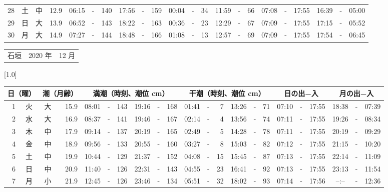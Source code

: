 \documentclass[12pt,a4j]{jsarticle}
\begin{document}
\begin{table}[htbp]
\begin{center}
{\begin{tabular}{|rc|cr|ccrccr|ccrccr|ccc|ccc|}
28 & 土 & 中 & 12.9 &  06:15 &-& 140 &  17:56 &-& 159 &  00:04 &-&  34 &  11:59 &-&  66 & 07:08 & -& 17:55 & 16:39 & -& 05:00 \\
29 & 日 & 大 & 13.9 &  06:52 &-& 143 &  18:22 &-& 163 &  00:36 &-&  23 &  12:29 &-&  67 & 07:09 & -& 17:55 & 17:15 & -& 05:52 \\
30 & 月 & 大 & 14.9 &  07:27 &-& 144 &  18:48 &-& 166 &  01:08 &-&  13 &  12:57 &-&  69 & 07:09 & -& 17:55 & 17:54 & -& 06:45 \\
   \hline
   \end{tabular}}
   \end{center}
\end{table}
\newpage
 \begin{table}[htbp]
 \begin{center}
 \begin{tabular}{lcc}
 \LARGE{石垣}  & \large{2020 年} & \large{12 月} \\
 \end{tabular}
 \end{center}
 \begin{center}
    \scalebox{0.7}[1.0]{
    \begin{tabular}{|rc|cr|ccrccr|ccrccr|ccc|ccc|}
    \hline
    \multicolumn{2}{|c|}{日（曜）} & \multicolumn{2}{c|}{潮（月齢）} & \multicolumn{6}{c|}{満潮（時刻、潮位 cm）} & \multicolumn{6}{c|}{干潮（時刻、潮位 cm）} & \multicolumn{3}{c|}{日の出−入} &  \multicolumn{3}{c|}{月の出−入}\\
 \hline
 1 & 火 & 大 & 15.9 &  08:01 &-& 143 &  19:16 &-& 168 &  01:41 &-&   7 &  13:26 &-&  71 & 07:10 & -& 17:55 & 18:38 & -& 07:39 \\
 2 & 水 & 大 & 16.9 &  08:37 &-& 141 &  19:46 &-& 167 &  02:14 &-&   4 &  13:56 &-&  74 & 07:11 & -& 17:55 & 19:26 & -& 08:34 \\
 3 & 木 & 中 & 17.9 &  09:14 &-& 137 &  20:19 &-& 165 &  02:49 &-&   5 &  14:28 &-&  78 & 07:11 & -& 17:55 & 20:19 & -& 09:29 \\
 4 & 金 & 中 & 18.9 &  09:56 &-& 133 &  20:55 &-& 160 &  03:27 &-&   8 &  15:03 &-&  82 & 07:12 & -& 17:55 & 21:15 & -& 10:20 \\
 5 & 土 & 中 & 19.9 &  10:44 &-& 129 &  21:37 &-& 152 &  04:08 &-&  15 &  15:45 &-&  87 & 07:13 & -& 17:55 & 22:14 & -& 11:09 \\
 6 & 日 & 中 & 20.9 &  11:40 &-& 126 &  22:31 &-& 143 &  04:55 &-&  23 &  16:41 &-&  92 & 07:13 & -& 17:55 & 23:13 & -& 11:54 \\
 7 & 月 & 小 & 21.9 &  12:45 &-& 126 &  23:46 &-& 134 &  05:51 &-&  32 &  18:02 &-&  93 & 07:14 & -& 17:56 & --:-- & -& 12:36 \\

\end{tabular}}
\end{center}
\end{table}
\end{document}
